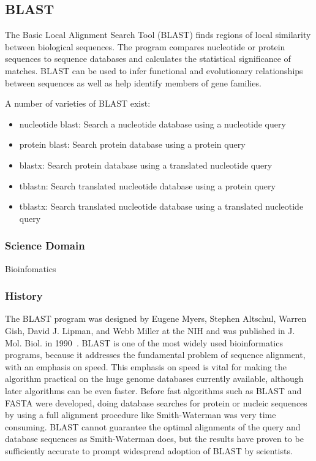 \documentclass[10pt,letterpaper]{article}
\begin{document}
\subsection{BLAST}

The Basic Local Alignment Search Tool (BLAST) finds regions of local similarity between biological sequences. The program compares nucleotide or protein sequences to sequence databases and calculates the statistical significance of matches. BLAST can be used to infer functional and evolutionary relationships between sequences as well as help identify members of gene families.

A number of varieties of BLAST exist:
\begin{itemize}
\item {nucleotide blast:} Search a nucleotide database using a nucleotide  query
\item {protein blast:} Search protein database using a protein  query
\item {blastx:} Search protein database using a translated nucleotide query
\item {tblastn:} Search translated nucleotide database using a protein  query
\item {tblastx:} Search translated nucleotide database using a translated nucleotide query
\end{itemize}

\subsubsection{Science Domain} Bioinfomatics


\subsubsection{History}
The BLAST program was designed by Eugene Myers, Stephen Altschul,
Warren Gish, David J. Lipman, and Webb Miller at the NIH and was
published in J. Mol. Biol. in 1990~\cite{blast-1990}.
BLAST is one of the most widely used bioinformatics
programs, because it addresses the fundamental problem of sequence
alignment, with an emphasis on speed.
This emphasis on speed is vital
for making the algorithm practical on the huge genome databases
currently available, although later algorithms can be even
faster. Before fast algorithms such as BLAST and FASTA were developed,
doing database searches for protein or nucleic sequences
by using a full alignment procedure like
Smith-Waterman was very time consuming. BLAST
cannot guarantee the optimal alignments of the query and database
sequences as Smith-Waterman does, but the results have proven to
be sufficiently accurate to prompt widespread adoption of BLAST by
scientists.
\end{document}
